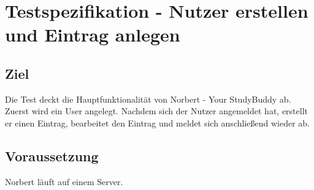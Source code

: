 
\chapter{Testspezifikation - Nutzer erstellen und Eintrag anlegen}
\section{Ziel}
Die Test deckt die Hauptfunktionalität von Norbert - Your StudyBuddy ab. Zuerst wird ein User angelegt. Nachdem sich der Nutzer angemeldet hat, erstellt er einen Eintrag, bearbeitet den Eintrag und meldet sich anschließend wieder ab.


\section{Voraussetzung}
Norbert läuft auf einem Server. 

